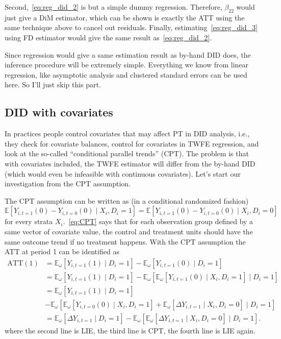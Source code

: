 \documentclass[12pt]{article}
\begin{document}
Second,~\eqref{eq:reg_did_2} is but a simple dummy regression. Therefore, \( \beta_{22} \) would
just give a DiM estimator, which can be shown is exactly the ATT using the same technique
above to cancel out residuals.
Finally, estimating~\eqref{eq:reg_did_3} using FD estimator would give the same result
as~\eqref{eq:reg_did_2}.

Since regression would give a same estimation result as by-hand DID does, the inference
procedure will be extremely simple.
Everything we know from linear regression, like asymptotic analysis and clustered
standard errors can be used here.
So I'll just skip this part.

\subsection{DID with covariates}

In practices people control covariates that may affect PT in DID analysis, i.e.,
they check for covariate balances, control for covariates in TWFE regression,
and look at the so-called ``conditional parallel trends'' (CPT). The problem is that with
covariates included,
the TWFE estimator will differ from the by-hand DID (which would even be infeasible with
continuous covariates). Let's start our investigation from the CPT assumption.

The CPT assumption can be written as (in a conditional randomized fashion)
\begin{equation}
  \mathbb{E}[Y_{i,t=1}(0)  - Y_{i,t=0}(0) \mid X_i,D_i=1] =
  \mathbb{E}[Y_{i,t=1}(0) - Y_{i,t=0}(0) \mid X_i,D_i=0]\label{eq:CPT}
\end{equation}
for every strata \( X_i \).~\eqref{eq:CPT} says that for each observation group defined
by a same vector of
covariate value, the control and treatment units should have the same outcome trend if no
treatment happens. With the CPT assumption the ATT at period 1 can be identified as
\begin{align}
  \text{ATT}(1) &= \mathbb{E}_{\omega } [Y_{i,t=1}(1) \mid D_i=1] - \mathbb{E}_{\omega }
  [Y_{i,t=1}(0) \mid D_i=1] \nonumber \\
  &= \mathbb{E}_{\omega } [Y_{i,t=1}(1) \mid D_i=1] - \mathbb{E}_{\omega } \left[
  \mathbb{E}_{\omega } [Y_{i,t=1}(0) \mid X_i,D_i=1] \mid D_i=1 \right]  \nonumber \\
  &= \mathbb{E}_{\omega } [Y_{i,t=1}(1) \mid D_i=1] \nonumber \\
  &- \mathbb{E}_{\omega }\left[\mathbb{E}_{\omega }[Y_{i,t=0}(0) \mid X_i,D_i=1] +
  \mathbb{E}_{\omega }[\Delta Y_{i,t=1} \mid X_i,D_i=0] \mid D_i=1\right] \nonumber \\
  &= \mathbb{E}_{\omega }[\Delta Y_{i,t=1} \mid D_{i}=1] - \mathbb{E}_{\omega }\left[
  \mathbb{E}_{\omega }[\Delta Y_{i,t=1} \mid X_i,D_i=0] \mid D_i=1\right] \label{eq:att_cond}
  .
\end{align}
where the second line is LIE, the third line is CPT, the fourth line is LIE again.
\end{document}
